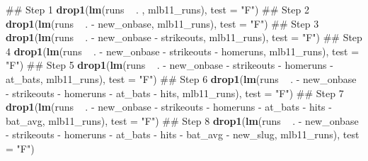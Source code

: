\documentclass[]{book}
\newenvironment{Shaded}{\begin{snugshade}}{\end{snugshade}}
\newcommand{\KeywordTok}[1]{\textcolor[rgb]{0.13,0.29,0.53}{\textbf{{#1}}}}
\newcommand{\DataTypeTok}[1]{\textcolor[rgb]{0.13,0.29,0.53}{{#1}}}
\newcommand{\StringTok}[1]{\textcolor[rgb]{0.31,0.60,0.02}{{#1}}}
\newcommand{\NormalTok}[1]{{#1}}
\theoremstyle{definition}
\theoremstyle{definition}
\theoremstyle{definition}
\theoremstyle{remark}
\begin{document}
\begin{Shaded}
\begin{Highlighting}[]
\NormalTok{## Step 1}
\KeywordTok{drop1}\NormalTok{(}\KeywordTok{lm}\NormalTok{(runs ~}\StringTok{ }\NormalTok{. , mlb11_runs), }\DataTypeTok{test =} \StringTok{"F"}\NormalTok{)}
\NormalTok{## Step 2}
\KeywordTok{drop1}\NormalTok{(}\KeywordTok{lm}\NormalTok{(runs ~}\StringTok{ }\NormalTok{. -}\StringTok{ }\NormalTok{new_onbase, mlb11_runs), }\DataTypeTok{test =} \StringTok{"F"}\NormalTok{)}
\NormalTok{## Step 3}
\KeywordTok{drop1}\NormalTok{(}\KeywordTok{lm}\NormalTok{(runs ~}\StringTok{ }\NormalTok{. -}\StringTok{ }\NormalTok{new_onbase -}\StringTok{ }\NormalTok{strikeouts, mlb11_runs), }\DataTypeTok{test =} \StringTok{"F"}\NormalTok{)}
\NormalTok{## Step 4}
\KeywordTok{drop1}\NormalTok{(}\KeywordTok{lm}\NormalTok{(runs ~}\StringTok{ }\NormalTok{. -}\StringTok{ }\NormalTok{new_onbase -}\StringTok{ }\NormalTok{strikeouts -}\StringTok{ }\NormalTok{homeruns, mlb11_runs), }\DataTypeTok{test =} \StringTok{"F"}\NormalTok{)}
\NormalTok{## Step 5}
\KeywordTok{drop1}\NormalTok{(}\KeywordTok{lm}\NormalTok{(runs ~}\StringTok{ }\NormalTok{. -}\StringTok{ }\NormalTok{new_onbase -}\StringTok{ }\NormalTok{strikeouts -}\StringTok{ }\NormalTok{homeruns -}\StringTok{ }\NormalTok{at_bats, mlb11_runs), }\DataTypeTok{test =} \StringTok{"F"}\NormalTok{)}
\NormalTok{## Step 6}
\KeywordTok{drop1}\NormalTok{(}\KeywordTok{lm}\NormalTok{(runs ~}\StringTok{ }\NormalTok{. -}\StringTok{ }\NormalTok{new_onbase -}\StringTok{ }\NormalTok{strikeouts -}\StringTok{ }\NormalTok{homeruns -}\StringTok{ }\NormalTok{at_bats -}\StringTok{ }\NormalTok{hits, mlb11_runs), }\DataTypeTok{test =} \StringTok{"F"}\NormalTok{)}
\NormalTok{## Step 7}
\KeywordTok{drop1}\NormalTok{(}\KeywordTok{lm}\NormalTok{(runs ~}\StringTok{ }\NormalTok{. -}\StringTok{ }\NormalTok{new_onbase -}\StringTok{ }\NormalTok{strikeouts -}\StringTok{ }\NormalTok{homeruns -}\StringTok{ }\NormalTok{at_bats -}\StringTok{ }\NormalTok{hits  -}\StringTok{ }\NormalTok{bat_avg, mlb11_runs), }\DataTypeTok{test =} \StringTok{"F"}\NormalTok{)}
\NormalTok{## Step 8}
\KeywordTok{drop1}\NormalTok{(}\KeywordTok{lm}\NormalTok{(runs ~}\StringTok{ }\NormalTok{. -}\StringTok{ }\NormalTok{new_onbase -}\StringTok{ }\NormalTok{strikeouts -}\StringTok{ }\NormalTok{homeruns -}\StringTok{ }\NormalTok{at_bats -}\StringTok{ }\NormalTok{hits  -}\StringTok{ }\NormalTok{bat_avg -}\StringTok{ }\NormalTok{new_slug, mlb11_runs), }\DataTypeTok{test =} \StringTok{"F"}\NormalTok{)}
\end{Highlighting}
\end{Shaded}
\end{document}
